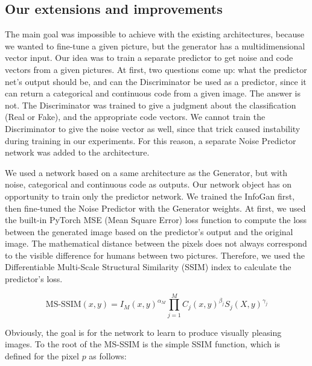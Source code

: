 \documentclass{egpubl}
\begin{document}
\subsection{Our extensions and improvements}

The main goal was impossible to achieve with the existing architectures, because we wanted to fine-tune a given picture, but the generator has a multidimensional vector input. Our idea was to train a separate %
predictor to get noise and code vectors from a given pictures. At first, %
two questions come up: what the predictor net’s output should be, and can the Discriminator be used as a predictor, since %
it can return %
a categorical and continuous code from a given image. The answer is not. The Discriminator was trained to give a judgment about the classification (Real or Fake), and the appropriate code vectors. We cannot train the Discriminator to give the noise vector as well, since %
that trick caused instability during training in our experiments. %
For this reason, a separate Noise Predictor network was added to the architecture.

We used a network based on a same architecture as the Generator, %
but with noise, categorical and continuous code as outputs. Our network object has on opportunity to train only the predictor network. %
We trained the InfoGan first, %
then fine-tuned the Noise Predictor with the Generator weights. At first, we used the built-in PyTorch MSE (Mean Square Error) loss function to compute the loss between the generated image based on the predictor’s output and the original image. The mathematical %
distance between the pixels does not always correspond to %
the visible difference for humans between two pictures. Therefore, we used the Differentiable Multi-Scale Structural Similarity (SSIM) index to calculate the predictor’s loss. %

\begin{displaymath}
\mathrm{MS\mbox{-}SSIM}(x,y) = I_M(x,y)^{\alpha_M} \prod_{j=1}^{M} C_j(x,y)^{\beta_j}S_j(X,y)^{\gamma_j}
\end{displaymath}

Obviously, the goal is for the network to learn to produce visually pleasing images. To the root of the MS-SSIM is the simple SSIM function, %
which is defined for the pixel $p$ as follows:
\end{document}
